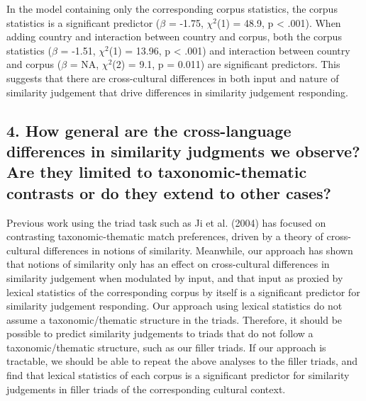 \documentclass[10pt, letterpaper]{article}
\begin{document}
In the model containing only the corresponding corpus statistics, the
corpus statistics is a significant predictor (\(\beta\) = -1.75,
\(\chi^2\)(1) = 48.9, p \textless{} .001). When adding country and
interaction between country and corpus, both the corpus statistics
(\(\beta\) = -1.51, \(\chi^2\)(1) = 13.96, p \textless{} .001) and
interaction between country and corpus (\(\beta\) = NA, \(\chi^2\)(2) =
9.1, p = 0.011) are significant predictors. This suggests that there are
cross-cultural differences in both input and nature of similarity
judgement that drive differences in similarity judgement responding.

\hypertarget{how-general-are-the-cross-language-differences-in-similarity-judgments-we-observe-are-they-limited-to-taxonomic-thematic-contrasts-or-do-they-extend-to-other-cases}{%
\subsection{4. How general are the cross-language differences in
similarity judgments we observe? Are they limited to taxonomic-thematic
contrasts or do they extend to other
cases?}\label{how-general-are-the-cross-language-differences-in-similarity-judgments-we-observe-are-they-limited-to-taxonomic-thematic-contrasts-or-do-they-extend-to-other-cases}}

Previous work using the triad task such as Ji et al. (2004) has focused
on contrasting taxonomic-thematic match preferences, driven by a theory
of cross-cultural differences in notions of similarity. Meanwhile, our
approach has shown that notions of similarity only has an effect on
cross-cultural differences in similarity judgement when modulated by
input, and that input as proxied by lexical statistics of the
corresponding corpus by itself is a significant predictor for similarity
judgement responding. Our approach using lexical statistics do not
assume a taxonomic/thematic structure in the triads. Therefore, it
should be possible to predict similarity judgements to triads that do
not follow a taxonomic/thematic structure, such as our filler triads. If
our approach is tractable, we should be able to repeat the above
analyses to the filler triads, and find that lexical statistics of each
corpus is a significant predictor for similarity judgements in filler
triads of the corresponding cultural context.
\end{document}
